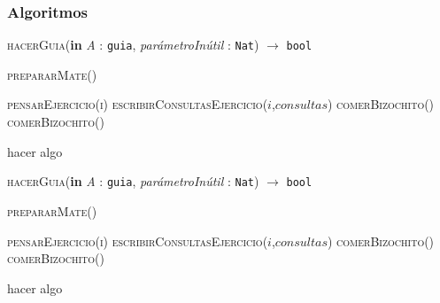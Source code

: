 \subsubsection*{Algoritmos}
\begin{algorithm}[H]
  \caption{\textsc{hacerGuia}(\textbf{in} \textit{A} : \texttt{guia}, \textit{parámetroInútil} : \texttt{Nat}) $\longrightarrow$ \texttt{bool}}
  \begin{algorithmic}[1]
    \State {} 

    \State {} 

    \State {}

    \State \textsc{prepararMate()} 

    \State \textsc{pensarEjercicio(i)}
      \State \textsc{escribirConsultasEjercicio($i$,$consultas$)}
    \Else
      \State \textsc{comerBizochito()}
    \EndIf
      \State \textsc{comerBizochito()}
    \EndWhile

         \State hacer algo
    \EndFor

    \State {}
  \end{algorithmic}
\end{algorithm}
\begin{algorithm}[H]
  \caption{\textsc{hacerGuia}(\textbf{in} \textit{A} : \texttt{guia}, \textit{parámetroInútil} : \texttt{Nat}) $\longrightarrow$ \texttt{bool}}
  \begin{algorithmic}[1]
    \State {} 

    \State {} 

    \State {}

    \State \textsc{prepararMate()} 

    \State \textsc{pensarEjercicio(i)}
      \State \textsc{escribirConsultasEjercicio($i$,$consultas$)}
    \Else
      \State \textsc{comerBizochito()}
    \EndIf
      \State \textsc{comerBizochito()}
    \EndWhile

         \State hacer algo
    \EndFor

    \State {}
  \end{algorithmic}
\end{algorithm}
\newpage

